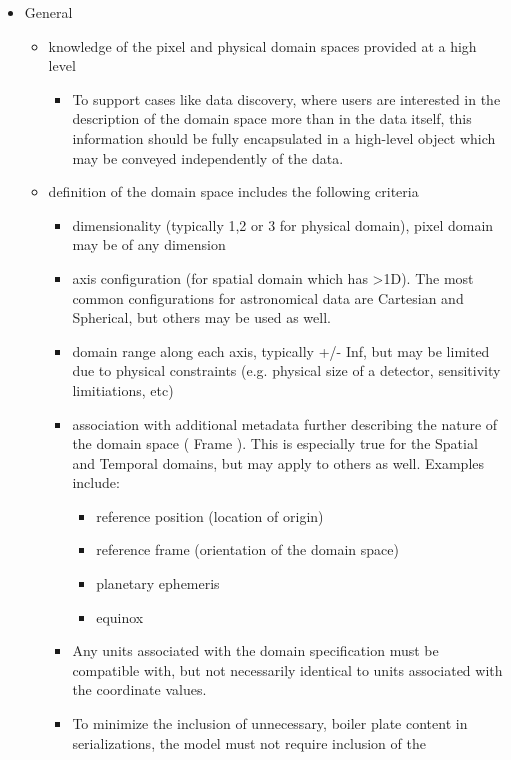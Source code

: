 \documentclass[11pt,a4paper]{ivoa}
\begin{document}
  \begin{itemize}
    \item General
    \begin{itemize}
       \item knowledge of the pixel and physical domain spaces provided at a high level
       \begin{itemize}
          \item To support cases like data discovery, where users are interested in the 
            description of the domain space more than in the data itself, this information should 
            be fully encapsulated in a high-level object which may be conveyed independently 
            of the data.
       \end{itemize}
       \item definition of the domain space includes the following criteria
       \begin{itemize}
          \item dimensionality (typically 1,2 or 3 for physical domain), pixel domain may be of any dimension
          \item axis configuration (for spatial domain which has >1D).  The most common configurations for astronomical data are Cartesian and Spherical, but others may be used as well.
          \item domain range along each axis, typically +/- Inf, but may be limited due to physical constraints (e.g. physical size of a detector, sensitivity limitiations, etc)
          \item association with additional metadata further describing the nature of the domain space ( Frame ).  This is especially true for the Spatial and Temporal domains, but may apply to others as well.  Examples include:
          \begin{itemize}
             \item reference position (location of origin)
             \item reference frame (orientation of the domain space)
             \item planetary ephemeris
             \item equinox
          \end{itemize}
          \item Any units associated with the domain specification must be compatible with, but not necessarily identical to units associated with the coordinate values.
          \item To minimize the inclusion of unnecessary, boiler plate content in serializations, the model must not require inclusion of the

\end{itemize}
\end{itemize}
\end{itemize}
\end{document}
